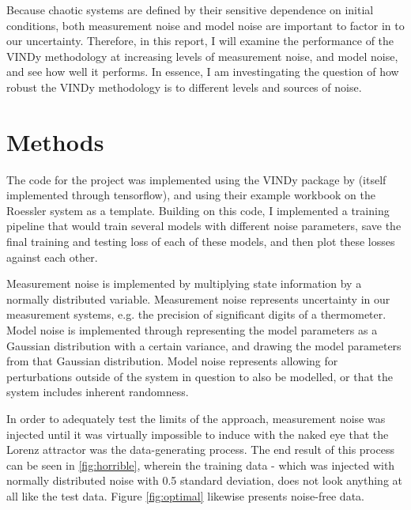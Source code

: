 \documentclass{article}
\begin{document}
Because chaotic systems are defined by their sensitive dependence on initial conditions, both measurement noise and model noise are important to factor in to our uncertainty. Therefore, in this report, I will examine the performance of the VINDy methodology at increasing levels of measurement noise, and model noise, and see how well it performs. In essence, I am investingating the question of how robust the VINDy methodology is to different levels and sources of noise.

\section{Methods}
\label{methods}

The code for the project was implemented using the VINDy package by \citet{contiVENIVINDyVICI2024} (itself implemented through tensorflow), and using their example workbook on the Roessler system as a template. Building on this code, I implemented a training pipeline that would train several models with different noise parameters, save the final training and testing loss of each of these models, and then plot these losses against each other.

Measurement noise is implemented by multiplying state information by a normally distributed variable. Measurement noise represents uncertainty in our measurement systems, e.g. the precision of significant digits of a thermometer. Model noise is implemented through representing the model parameters as a Gaussian distribution with a certain variance, and drawing the model parameters from that Gaussian distribution. Model noise represents allowing for perturbations outside of the system in question to also be modelled, or that the system includes inherent randomness. 

In order to adequately test the limits of the approach, measurement noise was injected until it was virtually impossible to induce with the naked eye that the Lorenz attractor was the data-generating process. The end result of this process can be seen in \ref{fig:horrible}, wherein the training data - which was injected with normally distributed noise with 0.5 standard deviation, does not look anything at all like the test data. Figure \ref{fig:optimal} likewise presents noise-free data.
\end{document}
